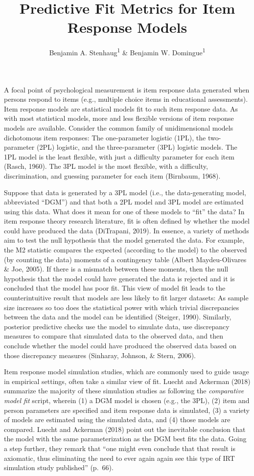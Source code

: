 \documentclass[
  english,
  man,floatsintext]{apa7}
\title{Predictive Fit Metrics for Item Response Models}
\author{Benjamin A. Stenhaug\textsuperscript{1} \& Benjamin W. Domingue\textsuperscript{1}}
\date{}
\affiliation{\vspace{0.5cm}\textsuperscript{1} The Graduate School of Education at Stanford University}
\begin{document}
\maketitle

A focal point of psychological measurement is item response data generated when persons respond to items (e.g., multiple choice items in educational assessments). Item response models are statistical models fit to such item response data. As with most statistical models, more and less flexible versions of item response models are available. Consider the common family of unidimensional models dichotomous item responses: The one-parameter logistic (1PL), the two-parameter (2PL) logistic, and the three-parameter (3PL) logistic models. The 1PL model is the least flexible, with just a difficulty parameter for each item (Rasch, 1960). The 3PL model is the most flexible, with a difficulty, discrimination, and guessing parameter for each item (Birnbaum, 1968).

Suppose that data is generated by a 3PL model (i.e., the data-generating model, abbreviated ``DGM'') and that both a 2PL model and 3PL model are estimated using this data. What does it mean for one of these models to ``fit'' the data? In item response theory research literature, fit is often defined by whether the model could have produced the data (DiTrapani, 2019). In essence, a variety of methods aim to test the null hypothesis that the model generated the data. For example, the M2 statistic compares the expected (according to the model) to the observed (by counting the data) moments of a contingency table (Albert Maydeu-Olivares \& Joe, 2005). If there is a mismatch between these moments, then the null hypothesis that the model could have generated the data is rejected and it is concluded that the model has poor fit. This view of model fit leads to the counterintuitive result that models are less likely to fit larger datasets: As sample size increases so too does the statistical power with which trivial discrepancies between the data and the model can be identified (Steiger, 1990). Similarly, posterior predictive checks use the model to simulate data, use discrepancy measures to compare that simulated data to the observed data, and then conclude whether the model could have produced the observed data based on those discrepancy measures (Sinharay, Johnson, \& Stern, 2006).

Item response model simulation studies, which are commonly used to guide usage in empirical settings, often take a similar view of fit. Luecht and Ackerman (2018) summarize the majority of these simulation studies as following the \emph{comparative model fit} script, wherein (1) a DGM model is chosen (e.g., the 3PL), (2) item and person parameters are specified and item response data is simulated, (3) a variety of models are estimated using the simulated data, and (4) those models are compared. Luecht and Ackerman (2018) point out the inevitable conclusion that the model with the same parameterization as the DGM best fits the data. Going a step further, they remark that ``one might even conclude that that result is axiomatic, thus eliminating the need to ever again again see this type of IRT simulation study published'' (p.~66).
\end{document}
